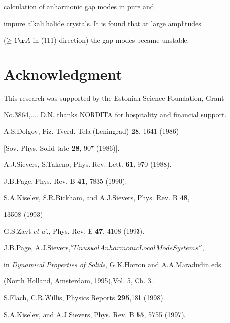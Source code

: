 {{calculation of anharmonic gap modes in pure and 

impure alkali halide crystals. It is found that at large amplitudes 

($\geq 1 \AA$ in (111) direction) the gap modes became unstable.

 

\section{Acknowledgment} 

This research was supported by the Estonian Science Foundation, Grant 

No.\~3864,$\ldots$.  D.N. thanks NORDITA for hospitality and financial support.

 

\begin{thebibliography}{99}




A.S.Dolgov, Fiz. Tverd. Tela (Leningrad) {\bf 28}, 1641 (1986)

[Sov. Phys. Solid tate {\bf 28}, 907 (1986)].


A.J.Sievers, S.Takeno, Phys. Rev. Lett. {\bf 61}, 970 (1988).


J.B.Page, Phys. Rev. B {\bf 41}, 7835 (1990).


S.A.Kiselev, S.R.Bickham, and A.J.Sievers, Phys. Rev. B {\bf 48},

13508 (1993)


G.S.Zavt {\it et al.}, Phys. Rev. E {\bf 47}, 4108 (1993).


J.B.Page, A.J.Sievers,$''Unusual Anharmonic Local Mode Systems''$,

in { \it Dynamical Properties of Solids}, G.K.Horton and A.A.Maradudin eds.

(North Holland, Amsterdam, 1995),Vol. 5,  Ch. 3.


S.Flach, C.R.Willis, Physics Reports {\bf 295},181 (1998).


S.A.Kiselev, and A.J.Sievers, Phys. Rev. B {\bf 55}, 5755 (1997).


\end{thebibliography}}}
